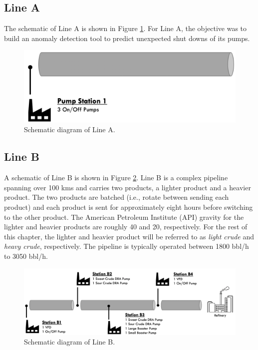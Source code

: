 \subsection{Line A}
The schematic of Line A is shown in Figure \ref{fig:08Line11}. For Line A, the objective was to build an anomaly detection tool to predict unexpected shut downs of its pumps.  

\begin{figure}[h]
    \centering
    \includegraphics[scale=0.45]{images/suncor/08Line11.png}
    \caption{Schematic diagram of Line A.}
    \label{fig:08Line11}
\end{figure}


\subsection{Line B}
A schematic of Line B is shown in Figure \ref{fig:08RM06A}.  Line B is a complex pipeline spanning over 100 kms and carries two products, a lighter product and a heavier product. The two products are batched (i.e., rotate between sending each product) and each product is sent for approximately eight hours before switching to the other product. The American Petroleum Institute (API) gravity for the lighter and heavier products are roughly 40 and 20, respectively. For the rest of this chapter, the lighter and heavier product will be referred to as \textit{light crude} and \textit{heavy crude}, respectively. The pipeline is typically operated between 1800 bbl/h to 3050 bbl/h. 

\begin{figure}[h]
    \centering
    \includegraphics[scale=0.33]{images/suncor/08RM06A.png}
    \caption{Schematic diagram of Line B.}
    \label{fig:08RM06A}
\end{figure}


